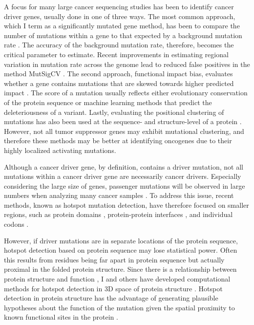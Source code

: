 A focus for many large cancer sequencing studies has been to identify cancer driver genes, usually done in one of three ways. The most common approach, which I term as a significantly mutated gene method, has been to compare the number of mutations within a gene to that expected by a background mutation rate \cite{RN158, RN156, RN2, RN3}.  The accuracy of the background mutation rate, therefore, becomes the critical parameter to estimate. Recent improvements in estimating regional variation in mutation rate across the genome lead to reduced false positives in the method MutSigCV \cite{RN55, RN29}.  The second approach, functional impact bias, evaluates whether a gene contains mutations that are skewed towards higher predicted impact \cite{RN53}. The score of a mutation usually reflects either evolutionary conservation of the protein sequence or machine learning methods that predict the deleteriousness of a variant. Lastly, evaluating the positional clustering of mutations has also been used at the sequence- and structure-level of a protein \cite{RN133, RN16, RN55, RN60, RN62, RN131, RN132, RN155, RN45, RN46, RN110, RN87, RN151, RN152, RN15, RN54}. However, not all tumor suppressor genes may exhibit mutational clustering, and therefore these methods may be better at identifying oncogenes due to their highly localized activating mutations.

Although a cancer driver gene, by definition, contains a driver mutation, not all mutations within a cancer driver gene are necessarily cancer drivers. Especially considering the large size of genes, passenger mutations will be observed in large numbers when analyzing many cancer samples \cite{RN56}. To address this issue, recent methods, known as hotspot mutation detection, have therefore focused on smaller regions, such as protein domains \cite{RN54}, protein-protein interfaces \cite{RN53}, and individual codons \cite{RN23}.

However, if driver mutations are in separate locations of the protein sequence, hotspot detection based on protein sequence may lose statistical power. Often this results from residues being far apart in protein sequence but actually proximal in the folded protein structure. Since there is a relationship between protein structure and function \cite{RN112, RN113}, I and others have developed computational methods for hotspot detection in 3D space of protein structure \cite{RN133, RN60, RN131, RN132, RN45, RN105, RN151, RN152, RN15}. Hotspot detection in protein structure has the advantage of generating plausible hypotheses about the function of the mutation given the spatial proximity to known functional sites in the protein \cite{RN57, RN60}.


